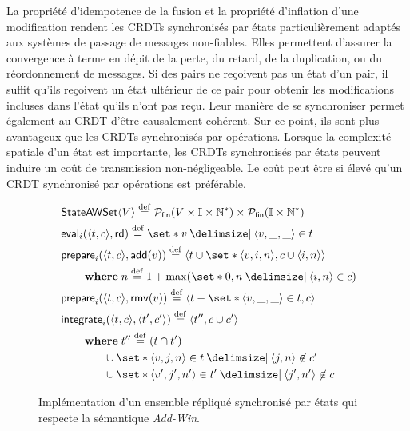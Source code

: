 La propriété d'idempotence de la fusion et la propriété d'inflation d'une modification rendent les \acp{CRDT} synchronisés par états particulièrement adaptés aux systèmes de passage de messages non-fiables.
Elles permettent d'assurer la convergence à terme en dépit de la perte, du retard, de la duplication, ou du réordonnement de messages.
Si des pairs ne reçoivent pas un état d'un pair, il suffit qu'ils reçoivent un état ultérieur de ce pair pour obtenir les modifications incluses dans l'état qu'ils n'ont pas reçu.
Leur manière de se synchroniser permet également au \ac{CRDT} d'être causalement cohérent.
Sur ce point, ils sont plus avantageux que les \acp{CRDT} synchronisés par opérations.
Lorsque la complexité spatiale d'un état est importante, les \acp{CRDT} synchronisés par états peuvent induire un coût de transmission non-négligeable.
Le coût peut être si élevé qu'un \ac{CRDT} synchronisé par opérations est préférable.

\begin{figure}[tb]
\centering
\begin{align}
&\trm{StateAWSet}\tuple*{V} \defeq \powerfset{V \times \mathbb{I} \times \mathbb{N}^*} \times \powerfset{\mathbb{I} \times \mathbb{N}^*} \label{eq:state-awset-state}\\
&\trm{eval}_i(\tuple*{t, c}, \trm{rd}) \defeq \set*{v \given \tuple*{v, \_, \_} \in t} \label{eq:state-awset-eval}\\
&\begin{aligned}
\MoveEqLeft\trm{prepare}_i(\tuple*{t, c}, \trm{add}(v)) \defeq \tuple*{t \cup \set*{\tuple*{v, i, n}},c \cup \tuple*{i, n}}\\
    &\where n \defeq 1 + \max(\set*{0,n \given \tuple*{i, n} \in c})
\end{aligned}\label{eq:state-awset-prep-add}\\
&\trm{prepare}_i(\tuple*{t, c}, \trm{rmv}(v)) \defeq \tuple*{t \sminus \set*{\tuple*{v, \_,\_} \in t},c} \label{eq:state-awset-prep-rmv}\\
&\begin{aligned}
\MoveEqLeft \trm{integrate}_i(\tuple*{t, c}, \tuple*{t', c'}) \defeq \tuple*{t'', c \cup c'}\\
    &\begin{aligned}
    \MoveEqLeft\where t'' \defeq (t \cap t')\\
    &\cup \set*{\tuple*{v, j, n} \in t \given \tuple*{j, n} \not\in c'}\\
    &\cup \set*{\tuple*{v', j', n'} \in t' \given \tuple*{j', n'} \not\in c}
    \end{aligned}
\end{aligned}\label{eq:state-awset-integr}
\end{align}
\caption[Implémentation d'un ensemble répliqué synchronisé par états]{Implémentation d'un ensemble répliqué synchronisé par états qui respecte la sémantique \emph{Add-Win}.}\label{fig:state-add-win-set}
\end{figure}

